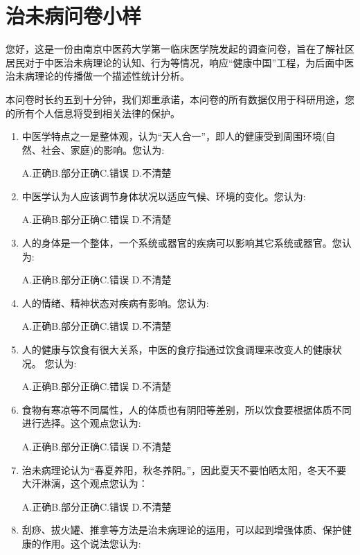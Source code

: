  \section{治未病问卷小样}
您好，这是一份由南京中医药大学第一临床医学院发起的调查问卷，旨在了解社区居民对于中医治未病理论的认知、行为等情况，响应“健康中国”工程，为后面中医治未病理论的传播做一个描述性统计分析。

本问卷时长约五到十分钟，我们郑重承诺，本问卷的所有数据仅用于科研用途，您的所有个人信息将受到相关法律的保护。

\begin{enumerate}
\item 中医学特点之一是整体观，认为“天人合一”，即人的健康受到周围环境(自然、社会、家庭)的影响。您认为:

A.正确\qquad B.部分正确\qquad C.错误 \qquad D.不清楚

\item 中医学认为人应该调节身体状况以适应气候、环境的变化。您认为:

A.正确\qquad B.部分正确\qquad C.错误 \qquad D.不清楚

\item 人的身体是一个整体，一个系统或器官的疾病可以影响其它系统或器官。您认为:

A.正确\qquad B.部分正确\qquad C.错误 \qquad D.不清楚

\item 人的情绪、精神状态对疾病有影响。您认为:

A.正确\qquad B.部分正确\qquad C.错误 \qquad D.不清楚

\item 人的健康与饮食有很大关系，中医的食疗指通过饮食调理来改变人的健康状况。
您认为:

A.正确\qquad B.部分正确\qquad C.错误 \qquad D.不清楚

\item 食物有寒凉等不同属性，人的体质也有阴阳等差别，所以饮食要根据体质不同进行选择。这个观点您认为:

A.正确\qquad B.部分正确\qquad C.错误 \qquad D.不清楚

\item 治未病理论认为“春夏养阳，秋冬养阴。”，因此夏天不要怕晒太阳，冬天不要大汗淋漓，这个观点您认为：

A.正确\qquad B.部分正确\qquad C.错误 \qquad D.不清楚

\item 刮痧、拔火罐、推拿等方法是治未病理论的运用，可以起到增强体质、保护健康的作用。这个说法您认为:


\end{enumerate}

